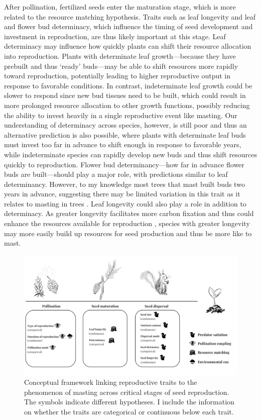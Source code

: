 \documentclass[11pt,letter]{article}
\begin{document}
After pollination, fertilized seeds enter the maturation stage, which is more related to the resource matching hypothesis. Traits such as leaf longevity and leaf and flower bud determinacy, which influence the timing of seed development and investment in reproduction, are thus likely important at this stage. Leaf determinacy \citep[whether the leaf material is prebuilt the year before or not,][]{lechowicz1984temperate} may influence how quickly plants can shift their resource allocation into reproduction. Plants with determinate leaf growth---because they have prebuilt and thus `ready' buds---may be able to shift resources more rapidly toward reproduction, potentially leading to higher reproductive output in response to favorable conditions. In contrast, indeterminate leaf growth could be slower to respond since new bud tissues need to be built, which could result in more prolonged resource allocation to other growth functions, possibly reducing the ability to invest heavily in a single reproductive event like masting.  Our understanding of determinacy across species, however, is still poor \citep{halle1978architectural, kozlowski1966shoot, marks1975relation} and thus an alternative prediction is also possible, where plants with determinate leaf buds must invest too far in advance to shift enough in response to favorable years, while indeterminate species can rapidly develop new buds and thus shift resources quickly to reproduction.  Flower bud determinancy---how far in advance flower buds are built---should play a major role, with predictions similar to leaf determinancy. However, to my knowledge most trees that mast built buds two years in advance, suggesting there may be limited variation in this trait as it relates to masting in trees \citep{burns1990silvics}. Leaf longevity could also play a role in addition to determinacy. As greater longevity facilitates more carbon fixation and thus could enhance the resources available for reproduction \citep{adler2014functional}, species with greater longevity may more easily build up resources for seed production and thus be more like to mast. 
\begin{figure}[H]
	\centering
	\includegraphics[width=1\linewidth]{conceptualChap1.png}
	\caption{Conceptual framework linking reproductive traits to the phenomenon of masting across critical stages of seed reproduction. The symbols indicate different hypotheses. I include the information on whether the traits are categorical or continuous below each trait.}
	\label{fig:conceptual1}
\end{figure}
\end{document}
